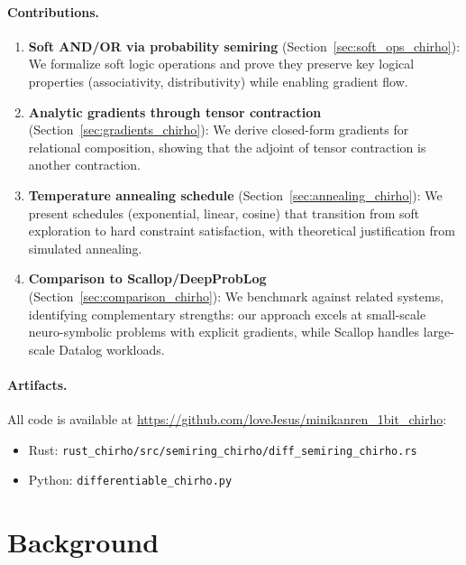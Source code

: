 \documentclass[11pt,a4paper]{article}
\begin{document}
\paragraph{Contributions.}
\begin{enumerate}
  \item \textbf{Soft AND/OR via probability semiring} (Section~\ref{sec:soft_ops_chirho}): We formalize soft logic operations and prove they preserve key logical properties (associativity, distributivity) while enabling gradient flow.

  \item \textbf{Analytic gradients through tensor contraction} (Section~\ref{sec:gradients_chirho}): We derive closed-form gradients for relational composition, showing that the adjoint of tensor contraction is another contraction.

  \item \textbf{Temperature annealing schedule} (Section~\ref{sec:annealing_chirho}): We present schedules (exponential, linear, cosine) that transition from soft exploration to hard constraint satisfaction, with theoretical justification from simulated annealing.

  \item \textbf{Comparison to Scallop/DeepProbLog} (Section~\ref{sec:comparison_chirho}): We benchmark against related systems, identifying complementary strengths: our approach excels at small-scale neuro-symbolic problems with explicit gradients, while Scallop handles large-scale Datalog workloads.
\end{enumerate}

\paragraph{Artifacts.}
All code is available at \url{https://github.com/loveJesus/minikanren_1bit_chirho}:
\begin{itemize}
  \item Rust: \texttt{rust\_chirho/src/semiring\_chirho/diff\_semiring\_chirho.rs}
  \item Python: \texttt{differentiable\_chirho.py}
\end{itemize}

\section{Background}
\label{sec:background_chirho}
\end{document}
